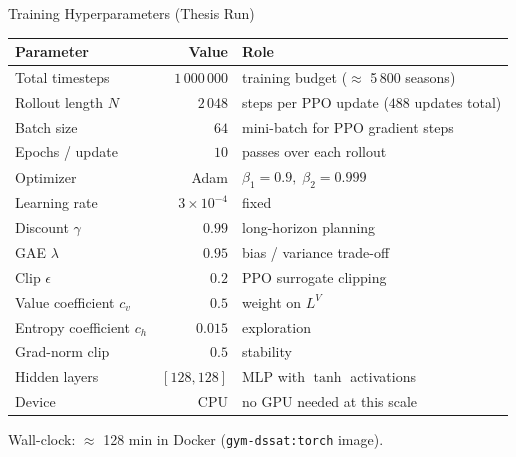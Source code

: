 \documentclass[10pt,aspectratio=169]{beamer}
\begin{document}
\begin{frame}{Training Hyperparameters (Thesis Run)}
  \centering
  \small
  \begin{tabular}{l r l}
    \toprule
    \textbf{Parameter} & \textbf{Value} & \textbf{Role} \\
    \midrule
    Total timesteps          & $1\,000\,000$ & training budget ($\approx$ 5\,800 seasons) \\
    Rollout length $N$       & $2\,048$      & steps per PPO update ($488$ updates total) \\
    Batch size               & $64$          & mini-batch for PPO gradient steps \\
    Epochs / update          & $10$          & passes over each rollout \\
    Optimizer                & Adam          & $\beta_1=0.9,\; \beta_2=0.999$ \\
    Learning rate            & $3\times10^{-4}$ & fixed \\
    Discount $\gamma$        & $0.99$        & long-horizon planning \\
    GAE $\lambda$            & $0.95$        & bias / variance trade-off \\
    Clip $\epsilon$          & $0.2$         & PPO surrogate clipping \\
    Value coefficient $c_v$  & $0.5$         & weight on $L^V$ \\
    Entropy coefficient $c_h$ & $0.015$      & exploration \\
    Grad-norm clip           & $0.5$         & stability \\
    Hidden layers            & $[128, 128]$  & MLP with $\tanh$ activations \\
    Device                   & CPU           & no GPU needed at this scale \\
    \bottomrule
  \end{tabular}

  \vspace{0.6em}
  \footnotesize Wall-clock: $\approx$ 128 min in Docker (\texttt{gym-dssat:torch} image).
\end{frame}
\end{document}
